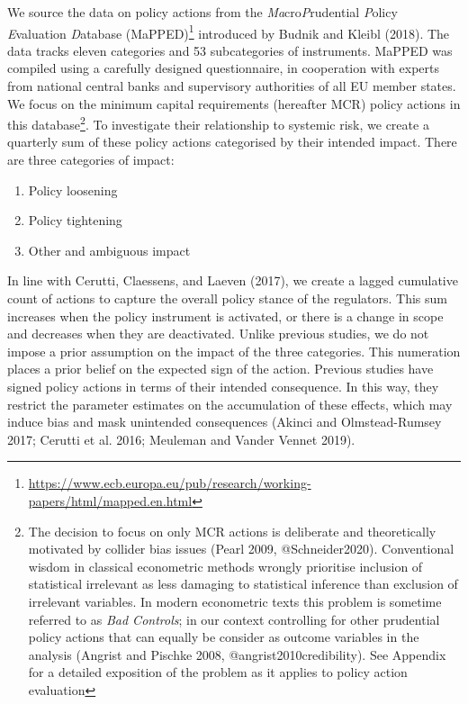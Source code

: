 \documentclass[
  10pt,
]{article}
\providecommand{\tightlist}{%
  \setlength{\itemsep}{0pt}\setlength{\parskip}{0pt}}
\begin{document}
We source the data on policy actions from the
\emph{Ma}cro\emph{P}rudential \emph{P}olicy \emph{E}valuation
\emph{D}atabase (MaPPED)\footnote{\url{https://www.ecb.europa.eu/pub/research/working-papers/html/mapped.en.html}}
introduced by Budnik and Kleibl (2018). The data tracks eleven
categories and 53 subcategories of instruments. MaPPED was compiled
using a carefully designed questionnaire, in cooperation with experts
from national central banks and supervisory authorities of all EU member
states. We focus on the minimum capital requirements (hereafter MCR)
policy actions in this database\footnote{The decision to focus on only
  MCR actions is deliberate and theoretically motivated by collider bias
  issues (Pearl 2009, @Schneider2020). Conventional wisdom in classical
  econometric methods wrongly prioritise inclusion of statistical
  irrelevant as less damaging to statistical inference than exclusion of
  irrelevant variables. In modern econometric texts this problem is
  sometime referred to as \emph{Bad Controls}; in our context
  controlling for other prudential policy actions that can equally be
  consider as outcome variables in the analysis (Angrist and Pischke
  2008, @angrist2010credibility). See Appendix for a detailed exposition
  of the problem as it applies to policy action evaluation}. To
investigate their relationship to systemic risk, we create a quarterly
sum of these policy actions categorised by their intended impact. There
are three categories of impact:

\begin{enumerate}
\def\labelenumi{\arabic{enumi}.}
\tightlist
\item
  Policy loosening
\item
  Policy tightening
\item
  Other and ambiguous impact
\end{enumerate}

In line with Cerutti, Claessens, and Laeven (2017), we create a lagged
cumulative count of actions to capture the overall policy stance of the
regulators. This sum increases when the policy instrument is activated,
or there is a change in scope and decreases when they are deactivated.
Unlike previous studies, we do not impose a prior assumption on the
impact of the three categories. This numeration places a prior belief on
the expected sign of the action. Previous studies have signed policy
actions in terms of their intended consequence. In this way, they
restrict the parameter estimates on the accumulation of these effects,
which may induce bias and mask unintended consequences (Akinci and
Olmstead-Rumsey 2017; Cerutti et al. 2016; Meuleman and Vander Vennet
2019).
\end{document}
